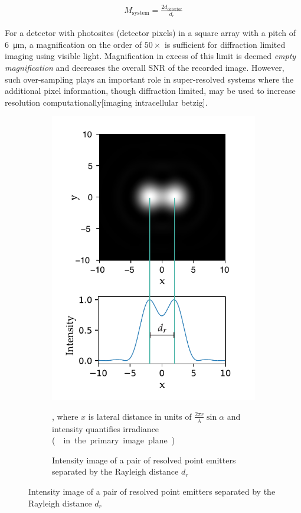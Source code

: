 \begin{align}
    M_\text{system} = \frac{2d_\text{detector}}{d_r}
\end{align}

For a detector with \gls{photosite}s (detector pixels) in a square array with a pitch of \SI{6}{\micro\meter}, a magnification on the order of \(50\times\) is sufficient for diffraction limited imaging using visible light.
Magnification in excess of this limit is deemed \emph{empty magnification} and decreases the overall \gls{SNR} of the recorded image.
However, such over-sampling plays an important role in super-resolved systems where the additional pixel information, though diffraction limited, may be used to increase resolution computationally[imaging intracellular betzig].%
\pagebreak
\begin{figure}
    \centering
    \begin{subfigure}[b]{\textwidth}
        \centering
        \includegraphics{./sampling/sample_master}
        \caption{Intensity image of a pair of resolved point emitters separated by the Rayleigh distance $d_{r}$}, where \(x\) is lateral distance in units of \(\frac{2\pi r }{\lambda}\sin {\alpha}\) and intensity quantifies irradiance (\SI{}{\watt\per\meter\square} in the primary image plane.)
        \label{fig:sample_master}
    \end{subfigure}
\end{figure}
